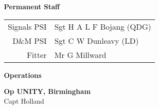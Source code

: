 \vspace*{10mm}

\pagebreak

\vspace*{10mm}

\begin{center}
  \Large
  \textbf{Permanent Staff}
\end{center}

\begin{center}
  \small
  \begin{tabular}{rl}
    Signals PSI & Sgt H A L F Bojang (QDG) \\
    D\&M PSI & Sgt C W Dunleavy (LD) \\
    Fitter & Mr G Millward \\
  \end{tabular}
\end{center}

\vspace*{10mm}

\begin{center}
  \Large
  \textbf{Operations}
\end{center}

\begin{center}
  \noindent
  \textbf{Op UNITY, Birmingham} \\
  Capt Holland \\
\end{center}
